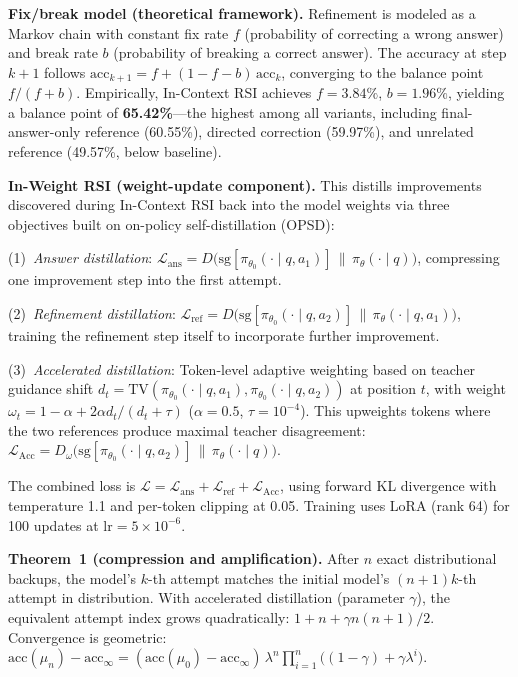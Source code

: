 \documentclass[11pt,a4paper]{article}
\begin{document}
\textbf{Fix/break model (theoretical framework).} Refinement is modeled as a Markov chain with constant fix rate $f$ (probability of correcting a wrong answer) and break rate $b$ (probability of breaking a correct answer). The accuracy at step $k{+}1$ follows $\text{acc}_{k+1} = f + (1 - f - b)\,\text{acc}_k$, converging to the balance point $f/(f+b)$. Empirically, In-Context RSI achieves $f{=}3.84\%$, $b{=}1.96\%$, yielding a balance point of \textbf{65.42\%}---the highest among all variants, including final-answer-only reference (60.55\%), directed correction (59.97\%), and unrelated reference (49.57\%, below baseline).

\textbf{In-Weight RSI (weight-update component).} This distills improvements discovered during In-Context RSI back into the model weights via three objectives built on on-policy self-distillation (OPSD):

(1)~\emph{Answer distillation}: $\mathcal{L}_{\text{ans}} = D\bigl(\mathrm{sg}[\pi_{\theta_0}(\cdot \mid q, a_1)] \,\|\, \pi_\theta(\cdot \mid q)\bigr)$, compressing one improvement step into the first attempt.

(2)~\emph{Refinement distillation}: $\mathcal{L}_{\text{ref}} = D\bigl(\mathrm{sg}[\pi_{\theta_0}(\cdot \mid q, a_2)] \,\|\, \pi_\theta(\cdot \mid q, a_1)\bigr)$, training the refinement step itself to incorporate further improvement.

(3)~\emph{Accelerated distillation}: Token-level adaptive weighting based on teacher guidance shift $d_t = \text{TV}(\pi_{\theta_0}(\cdot \mid q, a_1), \pi_{\theta_0}(\cdot \mid q, a_2))$ at position $t$, with weight $\omega_t = 1 - \alpha + 2\alpha d_t/(d_t + \tau)$ ($\alpha{=}0.5$, $\tau{=}10^{-4}$). This upweights tokens where the two references produce maximal teacher disagreement: $\mathcal{L}_{\text{Acc}} = D_\omega\bigl(\mathrm{sg}[\pi_{\theta_0}(\cdot \mid q, a_2)] \,\|\, \pi_\theta(\cdot \mid q)\bigr)$.

The combined loss is $\mathcal{L} = \mathcal{L}_{\text{ans}} + \mathcal{L}_{\text{ref}} + \mathcal{L}_{\text{Acc}}$, using forward KL divergence with temperature 1.1 and per-token clipping at 0.05. Training uses LoRA (rank 64) for 100 updates at $\text{lr}{=}5{\times}10^{-6}$.

\textbf{Theorem~1 (compression and amplification).} After $n$ exact distributional backups, the model's $k$-th attempt matches the initial model's $(n{+}1)k$-th attempt in distribution. With accelerated distillation (parameter $\gamma$), the equivalent attempt index grows quadratically: $1 + n + \gamma n(n{+}1)/2$. Convergence is geometric: $\text{acc}(\mu_n) - \text{acc}_\infty = (\text{acc}(\mu_0) - \text{acc}_\infty)\, \lambda^n \prod_{i=1}^{n} \bigl((1{-}\gamma) + \gamma\lambda^i\bigr)$.
\end{document}
